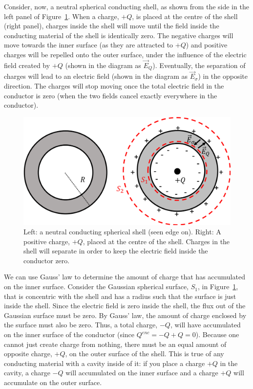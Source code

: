 Consider, now, a neutral spherical conducting shell, as shown from the side in the left panel of Figure~\ref{fig:gauss:sphereshell}. When a charge, $+Q$, is placed at the centre of the shell (right panel), charges inside the shell will move until the field inside the conducting material of the shell is identically zero. The negative charges will move towards the inner surface (as they are attracted to $+Q$) and positive charges will be repelled onto the outer surface, under the influence of the electric field created by $+Q$ (shown in the diagram as $\vec E_{Q}$). Eventually, the separation of charges will lead to an electric field (shown in the diagram as $\vec E_{\sigma}$) in the opposite direction. The charges will stop moving once the total electric field in the conductor is zero (when the two fields cancel exactly everywhere in the conductor).

\begin{figure}[!htbp]
\centering
\includegraphics[width=0.7\linewidth]{files/sphereshell-9b7f9182300681b8ecbe7b3c10387400.png}
\caption[]{Left: a neutral conducting spherical shell (seen edge on). Right: A positive charge, $+Q$, placed at the centre of the shell. Charges in the shell will separate in order to keep the electric field inside the conductor zero.}
\label{fig:gauss:sphereshell}
\end{figure}

We can use Gauss' law to determine the amount of charge that has accumulated on the inner surface. Consider the Gaussian spherical surface, $S_1$, in Figure~\ref{fig:gauss:sphereshell}, that is concentric with the shell and has a radius such that the surface is just inside the shell. Since the electric field is zero inside the shell, the flux out of the Gaussian surface must be zero. By Gauss' law, the amount of charge enclosed by the surface must also be zero. Thus, a total charge, $-Q$, will have accumulated on the inner surface of the conductor (since $Q^{enc}= -Q+Q=0$). Because one cannot just create charge from nothing, there must be an equal amount of opposite charge, $+Q$, on the outer surface of the shell. This is true of any conducting material with a cavity inside of it: if you place a charge $+Q$ in the cavity, a charge $-Q$ will accumulated on the inner surface and a charge $+Q$ will accumulate on the outer surface.

